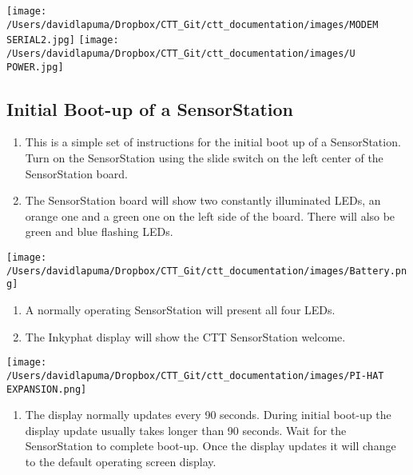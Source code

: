 \documentclass[
]{article}
\providecommand{\tightlist}{%
  \setlength{\itemsep}{0pt}\setlength{\parskip}{0pt}}
\begin{document}
\texttt{[image: /Users/davidlapuma/Dropbox/CTT\_Git/ctt\_documentation/images/MODEM SERIAL2.jpg]}
\texttt{[image: /Users/davidlapuma/Dropbox/CTT\_Git/ctt\_documentation/images/U POWER.jpg]}

\hypertarget{initial-boot-up-of-a-sensorstation}{%
\subsection{Initial Boot-up of a
SensorStation}\label{initial-boot-up-of-a-sensorstation}}

\begin{enumerate}
\def\labelenumi{\arabic{enumi}.}
\tightlist
\item
  This is a simple set of instructions for the initial boot up of a
  SensorStation. Turn on the SensorStation using the slide switch on the
  left center of the SensorStation board.
\item
  The SensorStation board will show two constantly illuminated LEDs, an
  orange one and a green one on the left side of the board. There will
  also be green and blue flashing LEDs.
\end{enumerate}

\texttt{[image: /Users/davidlapuma/Dropbox/CTT\_Git/ctt\_documentation/images/Battery.png]}

\begin{enumerate}
\def\labelenumi{\arabic{enumi}.}
\setcounter{enumi}{2}
\tightlist
\item
  A normally operating SensorStation will present all four LEDs.
\item
  The Inkyphat display will show the CTT SensorStation welcome.
\end{enumerate}

\texttt{[image: /Users/davidlapuma/Dropbox/CTT\_Git/ctt\_documentation/images/PI-HAT EXPANSION.png]}

\begin{enumerate}
\def\labelenumi{\arabic{enumi}.}
\setcounter{enumi}{4}
\tightlist
\item
  The display normally updates every 90 seconds. During initial boot-up
  the display update usually takes longer than 90 seconds. Wait for the
  SensorStation to complete boot-up. Once the display updates it will
  change to the default operating screen display.
\end{enumerate}
\end{document}
